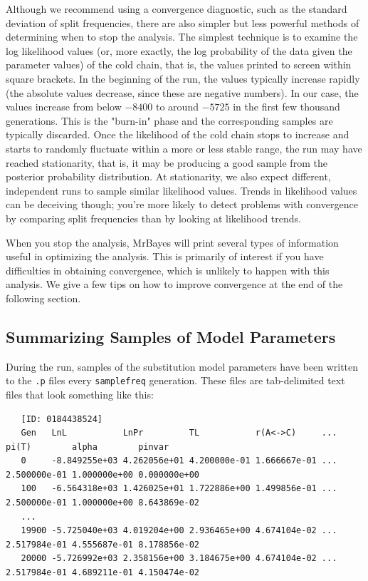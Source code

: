 \documentclass[12pt]{book}
\begin{document}
Although we recommend using a convergence diagnostic, such as the standard deviation of split frequencies, 
there are also simpler but less powerful methods of determining when to stop the analysis. The simplest 
technique is to examine the log likelihood values (or, more exactly, the log probability of the data given 
the parameter values) of the cold chain, that is, the values printed to screen within square brackets. In 
the beginning of the run, the values typically increase rapidly (the absolute values decrease, since these 
are negative numbers). In our case, the values increase from below $-8400$ to around $-5725$ in the first 
few thousand generations. This is the "burn-in" phase and the corresponding samples are typically discarded. 
Once the likelihood of the cold chain stops to increase and starts to randomly fluctuate within a more or 
less stable range, the run may have reached stationarity, that is, it may be producing a good sample from 
the posterior probability distribution. At stationarity, we also expect different, independent runs to 
sample similar likelihood values. Trends in likelihood values can be deceiving though; you're more likely to 
detect problems with convergence by comparing split frequencies than by looking at likelihood trends.

When you stop the analysis, MrBayes will print several types of information useful in optimizing the 
analysis. This is primarily of interest if you have difficulties in obtaining convergence, which is unlikely 
to happen with this analysis. We give a few tips on how to improve convergence at the end of the following 
section.

\subsection{Summarizing Samples of Model Parameters}

During the run, samples of the substitution model parameters have been written to the \texttt{.p} files 
every \texttt{samplefreq} generation. These files are tab-delimited text files that look something like this: 

\begin{singlespacing}
\small
\begin{verbatim}
   [ID: 0184438524]
   Gen   LnL           LnPr         TL           r(A<->C)     ... pi(T)        alpha        pinvar
   0     -8.849255e+03 4.262056e+01 4.200000e-01 1.666667e-01 ... 2.500000e-01 1.000000e+00 0.000000e+00
   100   -6.564318e+03 1.426025e+01 1.722886e+00 1.499856e-01 ... 2.500000e-01 1.000000e+00 8.643869e-02
   ...
   19900 -5.725040e+03 4.019204e+00 2.936465e+00 4.674104e-02 ... 2.517984e-01 4.555687e-01 8.178856e-02
   20000 -5.726992e+03 2.358156e+00 3.184675e+00 4.674104e-02 ... 2.517984e-01 4.689211e-01 4.150474e-02
\end{verbatim}
\normalsize
\end{singlespacing}
\end{document}
